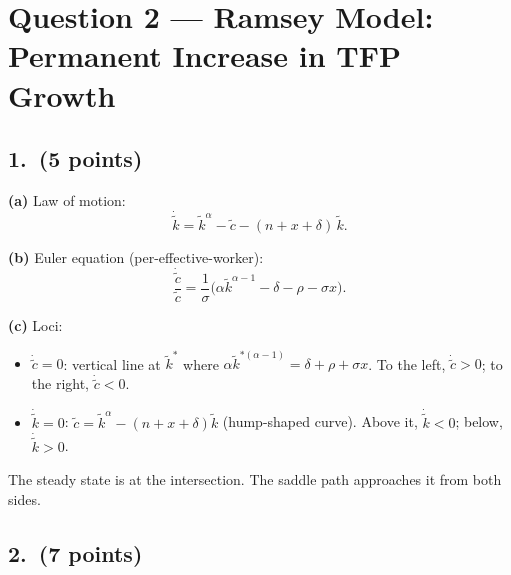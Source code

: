 \documentclass[a4paper,11pt]{article}
\newcommand{\ktilde}{\tilde{k}}
\newcommand{\ctilde}{\tilde{c}}
\begin{document}
\clearpage
\section{Question 2 --- Ramsey Model: Permanent Increase in TFP Growth}

\subsection*{1.\ (5 points)}

\begin{answerbox}
\textbf{(a)} Law of motion:
\[
    \dot{\ktilde} = \ktilde^{\alpha} - \ctilde - (n + x + \delta)\,\ktilde.
\]

\textbf{(b)} Euler equation (per-effective-worker):
\[
    \frac{\dot{\ctilde}}{\ctilde}
    = \frac{1}{\sigma}\bigl(\alpha\ktilde^{\alpha-1} - \delta - \rho - \sigma x\bigr).
\]

\textbf{(c)} Loci:
\begin{itemize}
    \item $\dot{\ctilde}=0$: vertical line at $\ktilde^*$ where
    $\alpha\ktilde^{*(\alpha-1)} = \delta + \rho + \sigma x$.
    To the left, $\dot{\ctilde}>0$; to the right, $\dot{\ctilde}<0$.
    \item $\dot{\ktilde}=0$: $\ctilde = \ktilde^{\alpha} - (n+x+\delta)\ktilde$
    (hump-shaped curve).  Above it, $\dot{\ktilde}<0$; below, $\dot{\ktilde}>0$.
\end{itemize}
The steady state is at the intersection.  The saddle path approaches it from both sides.
\end{answerbox}

\subsection*{2.\ (7 points)}
\end{document}

